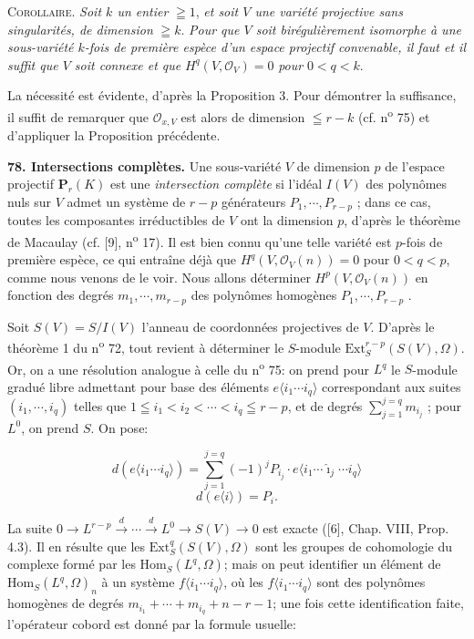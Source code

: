 \textsc{Corollaire}. \textit{Soit $k$ un entier} $\geqq 1$, \textit{et soit $V$ une variété projective sans singularités, de dimension} $\geqq k$. \textit{Pour que $V$ soit birégulièrement isomorphe à une sous-variété $k$-fois de première espèce d'un espace projectif convenable, il faut et il suffit que $V$ soit connexe et que} $H^q(V, \mathcal{O}_V) = 0$ \textit{pour} $0 < q < k$.

La nécessité est évidente, d'après la Proposition 3. Pour démontrer la suffisance, il suffit de remarquer que $\mathcal{O}_{x,V}$ est alors de dimension $\leqq r - k$ (cf. n\textsuperscript{o} 75) et d'appliquer la Proposition précédente.

\textbf{78. Intersections complètes.} Une sous-variété $V$ de dimension $p$ de l'espace projectif $\mathbf{P}_r(K)$ est une \textit{intersection complète} si l'idéal $I(V)$ des polynômes nuls sur $V$ admet un système de $r - p$ générateurs $P_1 , \cdots , P_{r-p}$ ; dans ce cas, toutes les composantes irréductibles de $V$ ont la dimension $p$, d'après le théorème de Macaulay (cf. [9], n\textsuperscript{o} 17). Il est bien connu qu'une telle variété est $p$-fois de première espèce, ce qui entraîne déjà que $H^q(V, \mathcal{O}_V(n)) = 0$ pour $0 < q < p$, comme nous venons de le voir. Nous allons déterminer $H^p(V, \mathcal{O}_V(n))$ en fonction des degrés $m_1 , \cdots , m_{r-p}$ des polynômes homogènes $P_1 , \cdots , P_{r-p}$ .

Soit $S(V) = S/I(V)$ l'anneau de coordonnées projectives de $V$. D'après le théorème 1 du n\textsuperscript{o} 72, tout revient à déterminer le $S$-module $\mathrm{Ext}_S^{r-p}(S(V), \Omega)$. Or, on a une résolution analogue à celle du n\textsuperscript{o} 75: on prend pour $L^q$ le $S$-module gradué libre admettant pour base des éléments $e\langle i_1 \cdots i_q \rangle$ correspondant aux suites $(i_1 , \cdots , i_q)$ telles que $1 \leqq i_1 < i_2 < \cdots < i_q \leqq r - p$, et de degrés $\sum_{j=1}^{j=q} m_{i_j}$ ; pour $L^0$, on prend $S$. On pose:

\begin{equation*}
d(e\langle i_1 \cdots i_q \rangle) = \sum_{j=1}^{j=q} (-1)^j P_{i_j} \cdot e\langle i_1 \cdots \hat{\imath}_j \cdots i_q \rangle
\end{equation*}
\begin{equation*}
d(e\langle i \rangle) = P_i .
\end{equation*}

La suite $0 \rightarrow L^{r-p} \overset{d}{\rightarrow} \cdots \overset{d}{\rightarrow} L^0 \rightarrow S(V) \rightarrow 0$ est exacte ([6], Chap. VIII, Prop. 4.3). Il en résulte que les $\mathrm{Ext}_S^q(S(V), \Omega)$ sont les groupes de cohomologie du complexe formé par les $\mathrm{Hom}_S(L^q, \Omega)$; mais on peut identifier un élément de $\mathrm{Hom}_S(L^q, \Omega)_n$ à un système $f\langle i_1 \cdots i_q \rangle$, où les $f\langle i_1 \cdots i_q \rangle$ sont des polynômes homogènes de degrés $m_{i_1} + \cdots + m_{i_q} + n - r - 1$; une fois cette identification faite, l'opérateur cobord est donné par la formule usuelle:

